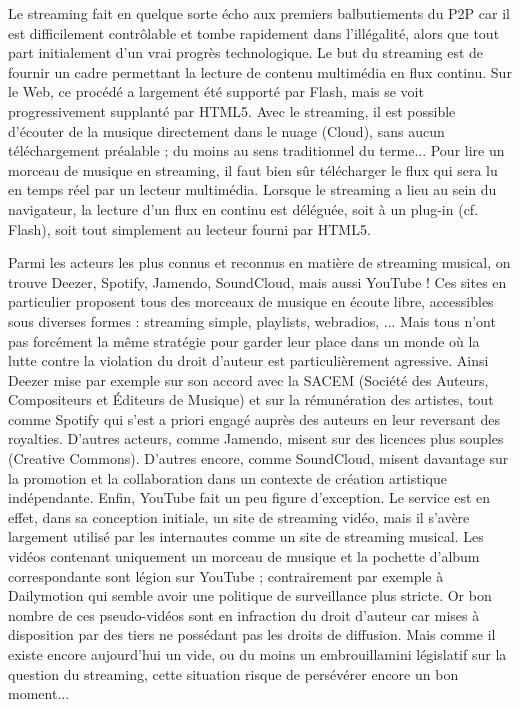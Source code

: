 \documentclass[a4paper,12pt]{article}
\begin{document}
Le streaming fait en quelque sorte écho aux premiers balbutiements du P2P car il est difficilement contrôlable et tombe rapidement dans l'illégalité, alors que tout part initialement d'un vrai progrès technologique. Le but du streaming est de fournir un cadre permettant la lecture de contenu multimédia en flux continu. Sur le Web, ce procédé a largement été supporté par Flash, mais se voit progressivement supplanté par HTML5. Avec le streaming, il est possible d'écouter de la musique directement dans le nuage (Cloud), sans aucun téléchargement préalable ; du moins au sens traditionnel du terme... Pour lire un morceau de musique en streaming, il faut bien sûr télécharger le flux qui sera lu en temps réel par un lecteur multimédia. Lorsque le streaming a lieu au sein du navigateur, la lecture d'un flux en continu est déléguée, soit à un plug-in (cf. Flash), soit tout simplement au lecteur fourni par HTML5.

Parmi les acteurs les plus connus et reconnus en matière de streaming musical, on trouve Deezer, Spotify, Jamendo, SoundCloud, mais aussi YouTube ! Ces sites en particulier proposent tous des morceaux de musique en écoute libre, accessibles sous diverses formes : streaming simple, playlists, webradios, ... Mais tous n'ont pas forcément la même stratégie pour garder leur place dans un monde où la lutte contre la violation du droit d'auteur est particulièrement agressive. Ainsi Deezer mise par exemple sur son accord avec la SACEM (Société des Auteurs, Compositeurs et Éditeurs de Musique) et sur la rémunération des artistes, tout comme Spotify qui s'est a priori engagé auprès des auteurs en leur reversant des royalties. D'autres acteurs, comme Jamendo, misent sur des licences plus souples (Creative Commons). D'autres encore, comme SoundCloud, misent davantage sur la promotion et la collaboration dans un contexte de création artistique indépendante. Enfin, YouTube fait un peu figure d'exception. Le service est en effet, dans sa conception initiale, un site de streaming vidéo, mais il s'avère largement utilisé par les internautes comme un site de streaming musical. Les vidéos contenant uniquement un morceau de musique et la pochette d'album correspondante sont légion sur YouTube ; contrairement par exemple à Dailymotion qui semble avoir une politique de surveillance plus stricte. Or bon nombre de ces pseudo-vidéos sont en infraction du droit d'auteur car mises à disposition par des tiers ne possédant pas les droits de diffusion. Mais comme il existe encore aujourd'hui un vide, ou du moins un embrouillamini législatif sur la question du streaming, cette situation risque de persévérer encore un bon moment...
\end{document}
